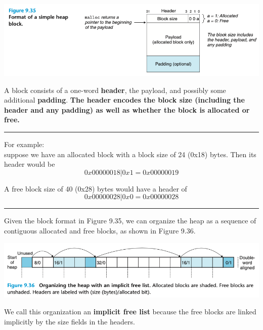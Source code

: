 \documentclass[11pt]{article}
\begin{document}
\begin{center}
\includegraphics[width=.9\linewidth]{pics/figure9.35-heap-block.png}
\end{center}

A block consists of a one-word \textbf{header}, the payload, and possibly some additional \textbf{padding}. \textbf{The header encodes the block size (including the header and any padding) as well as whether the block is allocated or free.}\\

\noindent\rule{\textwidth}{0.5pt}
For example:\\
suppose we have an allocated block with a block size of 24 (0x18) bytes. Then its header would be\\
\begin{equation}
0x00000018 | 0x1 = 0x00000019
\end{equation}

A free block size of 40 (0x28) bytes would have a header of\\
\begin{equation}
0x00000028 | 0x0 = 0x00000028
\end{equation}

\noindent\rule{\textwidth}{0.5pt}

Given the block format in Figure 9.35, we can organize the heap as a sequence of contiguous allocated and free blocks, as shown in Figure 9.36.\\

\begin{center}
\includegraphics[width=.9\linewidth]{pics/figure9.36-implicit-free-list.png}
\end{center}

We call this organization an \textbf{implicit free list} because the free blocks are linked implicitly by the size fields in the headers.\\
\end{document}
